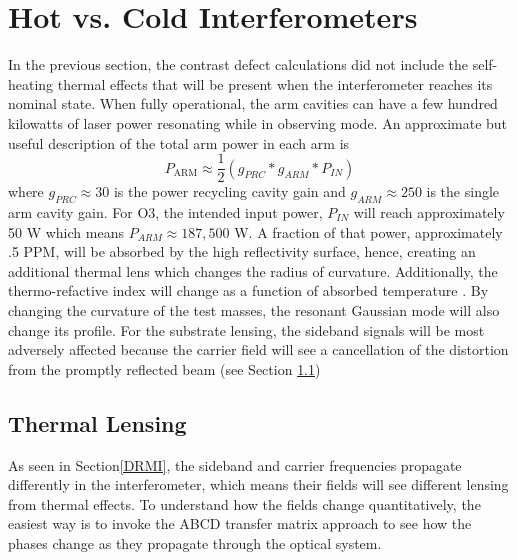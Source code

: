 	\section{Hot vs. Cold Interferometers}\label{hotcoldifo}
		In the previous section, the contrast defect calculations did not include the self-heating thermal effects that will be present when the interferometer reaches its nominal state.
		When fully operational, the arm cavities can have a few hundred kilowatts of laser power resonating while in observing mode. 
		An approximate but useful description of the total arm power in each arm is
	\begin{equation}
		P_{\text{ARM}} \approx \frac{1}{2} (g_{PRC} * g_{ARM} * P_{IN})
	\end{equation}
	where $g_{PRC} \approx 30$ is the power recycling cavity gain and $g_{ARM} \approx 250$ is the single arm cavity gain.
		For O3, the intended input power, $P_{IN}$ will reach approximately 50 W which means $P_{ARM} \approx 187,500$ W. 
		A fraction of that power, approximately .5 PPM, will be absorbed by the high reflectivity surface, hence, creating an additional thermal lens which changes the radius of curvature.  
		Additionally, the thermo-refactive index will change as a function of absorbed temperature \cite{winkler_thermaldist}.
		By changing the curvature of the test masses, the resonant Gaussian mode will also change its profile.
		For the substrate lensing, the sideband signals will be most adversely affected because the carrier field will see a cancellation of the distortion from the promptly reflected beam (see Section \ref{TL_lensing})
	
	\subsection{Thermal Lensing}\label{TL_lensing}
	\cite{hiro_thermal_lens}
		As seen in Section\ref{DRMI}, the sideband and carrier frequencies propagate differently in the interferometer, which means their fields will see different lensing from thermal effects.
		To understand how the fields change quantitatively, the easiest way is to invoke the ABCD transfer matrix approach to see how the phases change as they propagate through the optical system.
